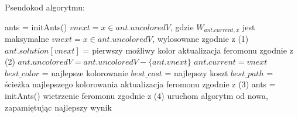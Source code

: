 \documentclass[11pt]{article}
\begin{document}
Pseudokod algorytmu:
\begin{algorithm} %
\label{alg2} %
\caption{}
\begin{algorithmic} %
	\STATE ants = initAnts()
    					\STATE $vnext = x \in ant.uncoloredV$, gdzie $W_{ant.current, x}$ jest maksymalne
					\ELSE    				
    					\STATE $vnext = x \in ant.uncoloredV$, wylosowane zgodnie z (1)
    				\ENDIF
    				\STATE $ant.solution[vnext]$ = pierwszy możliwy kolor
    				\STATE aktualizacja feromonu zgodnie z (2)
    				\STATE $ant.uncoloredV = ant.uncoloredV - \{ant.vnext\}$
    				\STATE $ant.current = vnext$
    			\ENDIF
    		\ENDFOR
    	\ENDWHILE
    	\STATE $best\_color$ =  najlepsze kolorowanie
    	\STATE $best\_cost$ =  najlepszy koszt
    	\STATE $best\_path$ =  ścieżka najlepszego kolorowania
    	\STATE aktualizacja feromonu zgodnie z (3)
		\STATE ants = initAnts()
    		\STATE wietrzenie feromonu zgodnie z (4)
    	\ENDIF
    		\STATE uruchom algorytm od nowa, zapamiętując najlepszy wynik
    	\ENDIF
    \ENDFOR
\end{algorithmic}
\end{algorithm}
\end{document}
